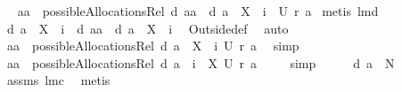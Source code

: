 \begin{isabellebody}
\isamarkupfalse%
\ \isamarkupfalse%
\ {\isachardoublequoteopen}{\isacharquery}aa\ {\isasymin}\ possibleAllocationsRel\ {\isacharparenleft}{\isacharquery}d\ {\isacharquery}aa\ {\isasymunion}\ {\isacharparenleft}{\isacharquery}d\ a\ {\isacharminus}\ X\ {\isasymunion}\ {\isacharbraceleft}i{\isacharbraceright}{\isacharparenright}{\isacharparenright}\ \ {\isacharparenleft}{\isacharquery}U\ {\isacharparenleft}{\isacharquery}r\ a{\isacharparenright}{\isacharparenright}{\isachardoublequoteclose}\isanewline
{}\isamarkupfalse%
\ {\isacharparenleft}metis\ lm{}{}d{\isacharparenright}\isanewline
\ \ \isamarkupfalse%
\ \isamarkupfalse%
\ {\isachardoublequoteopen}{\isacharquery}d\ a\ {\isacharminus}\ X\ {\isasymunion}\ {\isacharbraceleft}i{\isacharbraceright}\ {\isacharequal}\ {\isacharquery}d\ {\isacharquery}aa\ {\isasymunion}\ {\isacharparenleft}{\isacharquery}d\ a\ {\isacharminus}\ X\ {\isasymunion}\ {\isacharbraceleft}i{\isacharbraceright}{\isacharparenright}{\isachardoublequoteclose}\ \isamarkupfalse%
\ Outside{\isacharunderscore}def\ \isamarkupfalse%
\ auto\isanewline
\ \ \isamarkupfalse%
\ \isamarkupfalse%
\ {\isachardoublequoteopen}{\isacharquery}aa\ {\isasymin}\ possibleAllocationsRel\ {\isacharparenleft}{\isacharquery}d\ a\ {\isacharminus}\ X\ {\isasymunion}\ {\isacharbraceleft}i{\isacharbraceright}{\isacharparenright}\ {\isacharparenleft}{\isacharquery}U\ {\isacharparenleft}{\isacharquery}r\ a{\isacharparenright}{\isacharparenright}{\isachardoublequoteclose}\ \isamarkupfalse%
\ simp\isanewline
\ \ \isamarkupfalse%
\ \isamarkupfalse%
\ {\isachardoublequoteopen}{\isacharquery}aa\ {\isasymin}\ possibleAllocationsRel\ {\isacharparenleft}{\isacharquery}d\ a\ {\isasymunion}\ {\isacharbraceleft}i{\isacharbraceright}\ {\isacharminus}\ X{\isacharparenright}\ {\isacharparenleft}{\isacharquery}U\ {\isacharparenleft}{\isacharquery}r\ a{\isacharparenright}{\isacharparenright}{\isachardoublequoteclose}\ \isamarkupfalse%
\ {}\ \isamarkupfalse%
\ simp\isanewline
\ \ \isamarkupfalse%
\ \isamarkupfalse%
\ {\isachardoublequoteopen}{\isacharquery}d\ a\ {\isasymsubseteq}\ N{\isachardoublequoteclose}\ \isamarkupfalse%
\ assms{\isacharparenleft}{}{\isacharparenright}\ lm{}{}c\ \isamarkupfalse%
\ metis\isanewline

\end{isabellebody}
